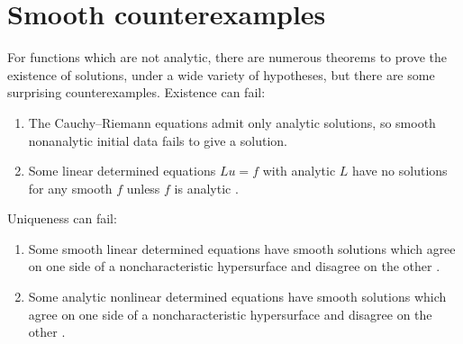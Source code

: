\section{Smooth counterexamples}
For functions which are not analytic, there are numerous theorems to prove the existence of solutions, under a wide variety of hypotheses, but there are some surprising counterexamples.
Existence can fail: 
\begin{enumerate}
\item
The Cauchy--Riemann equations admit only analytic solutions, so smooth nonanalytic initial data fails to give a solution.
\item
Some linear determined equations \(Lu=f\) with analytic \(L\) have no solutions for any smooth \(f\) unless \(f\) is analytic \cite{Lewy:1957}.
\end{enumerate}
Uniqueness can fail:
\begin{enumerate}
\item
Some smooth linear determined equations have smooth solutions which agree on one side of a noncharacteristic hypersurface and disagree on the other \cite{Alinhac/Baouendi:1995}.
\item
Some analytic nonlinear determined equations have smooth solutions which agree on one side of a noncharacteristic hypersurface and disagree on the other \cite{Metivier:1993}.
\end{enumerate}
